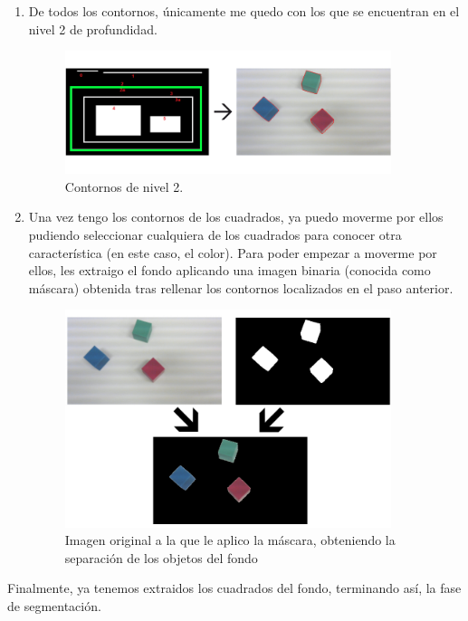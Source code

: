 \documentclass[11pt]{article}
\begin{document}
\begin{enumerate}
\item De todos los contornos, únicamente me quedo con los que se encuentran en el nivel 2 de profundidad.
\begin{figure}[h!]
  \centering
      \includegraphics[width=0.9\textwidth]{img10}
  \caption{Contornos de nivel 2.}
\end{figure}

\item Una vez tengo los contornos de los cuadrados, ya puedo moverme por ellos pudiendo seleccionar cualquiera de los cuadrados para conocer otra característica (en este caso, el color). Para poder empezar a moverme por ellos, les extraigo el fondo aplicando una imagen binaria (conocida como máscara) obtenida tras rellenar los contornos localizados en el paso anterior.
\begin{figure}[h!]
  \centering
      \includegraphics[width=0.9\textwidth]{img11}
  \caption{Imagen original a la que le aplico la máscara, obteniendo la separación de los objetos del fondo}
\end{figure}


\end{enumerate}
Finalmente, ya tenemos extraidos los cuadrados del fondo, terminando así, la fase de segmentación.
\end{document}
